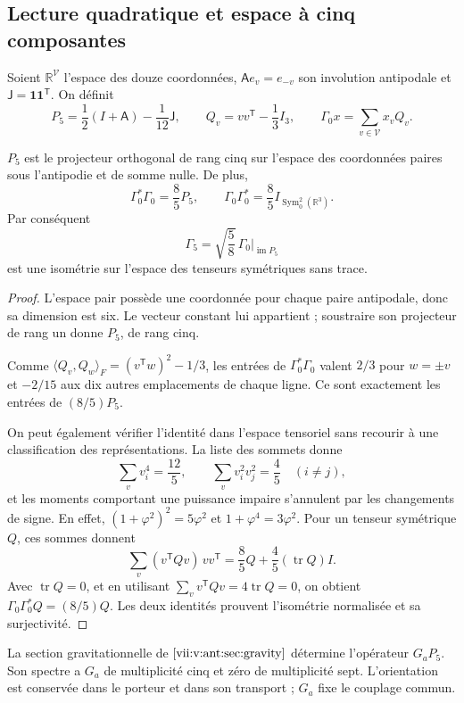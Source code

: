 \subsection{Lecture quadratique et espace à cinq composantes}
Soient \(\mathbb R^{\mathcal V}\) l'espace des douze coordonnées,
\(\mathsf A e_v=e_{-v}\) son involution antipodale et
\(\mathsf J=\mathbf1\mathbf1^{\mathsf T}\). On définit
\[
 P_5=\frac12(I+\mathsf A)-\frac1{12}\mathsf J,\qquad
 Q_v=vv^{\mathsf T}-\frac13I_3,\qquad
 \Gamma_0x=\sum_{v\in\mathcal V}x_vQ_v.
\]
\begin{theorem}
\label{vii:vii:thm:portador-pentacomponente}
\(P_5\) est le projecteur orthogonal de rang cinq sur l'espace des
coordonnées paires sous l'antipodie et de somme nulle. De plus,
\[
 \Gamma_0^*\Gamma_0=\frac85P_5,\qquad
 \Gamma_0\Gamma_0^*=\frac85I_{\operatorname{Sym}^2_0(\mathbb R^3)}.
\]
Par conséquent
\[
 \Gamma_5=\sqrt{\frac58}\,\Gamma_0|_{\operatorname{im}P_5}
\]
est une isométrie sur l'espace des tenseurs symétriques sans trace.
\end{theorem}
\begin{proof}
L'espace pair possède une coordonnée pour chaque paire antipodale, donc
sa dimension est six. Le vecteur constant lui appartient ; soustraire son
projecteur de rang un donne \(P_5\), de rang cinq.

Comme
\(\langle Q_v,Q_w\rangle_F=(v^{\mathsf T}w)^2-1/3\), les entrées
de \(\Gamma_0^*\Gamma_0\) valent \(2/3\) pour \(w=\pm v\) et
\(-2/15\) aux dix autres emplacements de chaque ligne. Ce sont
exactement les entrées de \((8/5)P_5\).

On peut également vérifier l'identité dans l'espace tensoriel sans recourir à une classification des représentations. La liste des sommets donne
\[
 \sum_vv_i^4=\frac{12}{5},\qquad
 \sum_vv_i^2v_j^2=\frac45\quad(i\ne j),
\]
et les moments comportant une puissance impaire s'annulent par les changements de signe. En effet, \((1+\varphi^2)^2=5\varphi^2\) et \(1+\varphi^4=3\varphi^2\). Pour un tenseur symétrique \(Q\), ces sommes donnent
\[
 \sum_v(v^{\mathsf T}Qv)\,vv^{\mathsf T}
 =\frac85Q+\frac45(\operatorname{tr}Q)I.
\]
Avec \(\operatorname{tr}Q=0\), et en utilisant
\(\sum_vv^{\mathsf T}Qv=4\operatorname{tr}Q=0\), on obtient
\(\Gamma_0\Gamma_0^*Q=(8/5)Q\). Les deux identités prouvent
l'isométrie normalisée et sa surjectivité.
\end{proof}

La section gravitationnelle de \(\ref{vii:v:ant:sec:gravity}\) détermine
l’opérateur \(G_aP_5\). Son spectre a \(G_a\) de multiplicité
cinq et zéro de multiplicité sept. L’orientation est conservée dans
le porteur et dans son transport ; \(G_a\) fixe le couplage commun.

